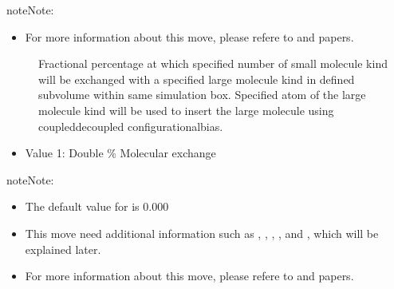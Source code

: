 \documentclass[letterpaper,10pt,english]{sphinxmanual}
\begin{document}
\begin{description}
\begin{sphinxadmonition}{note}{Note:}
\begin{itemize}
\item {} 
\sphinxAtStartPar
For more information about this move, please refere to  and  papers.

\end{itemize}
\end{sphinxadmonition}
\begin{description}
\item[{}] \leavevmode
\sphinxAtStartPar
Fractional percentage at which specified number of small molecule kind will be exchanged with a specified large molecule kind in defined sub\sphinxhyphen{}volume within same simulation box. Specified atom of the large molecule kind will be used to insert the large molecule using coupled\sphinxhyphen{}decoupled configurational\sphinxhyphen{}bias.

\end{description}
\begin{itemize}
\item {} 
\sphinxAtStartPar
Value 1: Double \sphinxhyphen{} \% Molecular exchange

\end{itemize}

\begin{sphinxadmonition}{note}{Note:}\begin{itemize}
\item {} 
\sphinxAtStartPar
The default value for  is 0.000

\item {} 
\sphinxAtStartPar
This move need additional information such as , , , , and , which will be explained later.

\item {} 
\sphinxAtStartPar
For more information about this move, please refere to  and  papers.

\end{itemize}
\end{sphinxadmonition}


\end{description}
\end{document}
